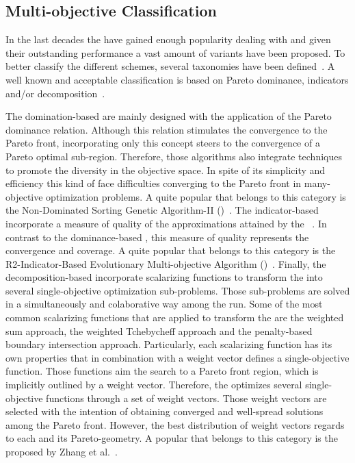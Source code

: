 \subsection{Multi-objective Classification}


In the last decades the \MOEAS{} have gained enough popularity dealing with \MOPS{} and given their outstanding performance a vast amount of variants have been proposed.
%
To better classify the different schemes, several taxonomies have been defined~\cite{bechikh2016recent}.
%
A well known and acceptable classification is based on Pareto dominance, indicators and/or decomposition~\cite{trivedi2016survey}.
%


The domination-based \MOEAS{} are mainly designed with the application of the Pareto dominance relation.
%
Although this relation stimulates the convergence to the Pareto front, incorporating only this concept steers to the convergence of a Pareto optimal sub-region.
%
Therefore, those algorithms also integrate techniques to promote the diversity in the objective space.
%
%
%
In spite of its simplicity and efficiency this kind of \MOEAS{} face difficulties converging to the Pareto front in many-objective optimization problems.
%
A quite popular \MOEA{} that belongs to this category is the Non-Dominated Sorting Genetic Algorithm-II (\NSGAII{})~\cite{deb2002fast}.
%
The indicator-based \MOEAS{} incorporate a measure of quality of the approximations attained by the \MOEAS{}~\cite{beume2007sms}.
%
In contrast to the dominance-based \MOEAS{}, this measure of quality represents the convergence and coverage.
%
A quite popular \MOEA{} that belongs to this category is the R2-Indicator-Based Evolutionary Multi-objective Algorithm (\RMOEA{})~\cite{trautmann2013r2}.
%
Finally, the decomposition-based \MOEAS{} incorporate scalarizing functions to transform the \MOP{} into several single-objective optimization sub-problems.
%
Those sub-problems are solved in a simultaneously and colaborative way among the run.
%
Some of the most common scalarizing functions that are applied to transform the \MOP{} are the weighted sum approach, the weighted Tchebycheff approach and the penalty-based boundary intersection approach.
%
Particularly, each scalarizing function has its own properties that in combination with a weight vector defines a single-objective function.
%
Those functions aim the search to a Pareto front region, which is implicitly outlined by a weight vector.
%
Therefore, the \MOEA{} optimizes several single-objective functions through a set of weight vectors.
%
Those weight vectors are selected with the intention of obtaining converged and well-spread solutions among the Pareto front.
%
However, the best distribution of weight vectors regards to each \MOP{} and its Pareto-geometry.
%
A popular \MOEA{} that belongs to this category is the \MOEAD{} proposed by Zhang et al.~\cite{zhang2007moea}.


